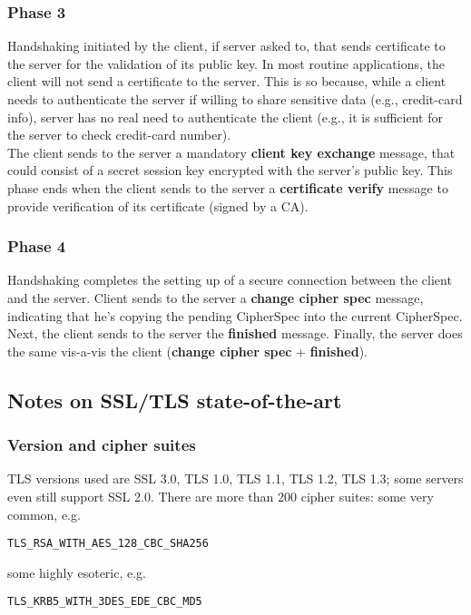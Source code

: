 \documentclass[a4paper, 10pt, titlepage]{article}
\begin{document}
\subsubsection{Phase 3}
Handshaking initiated by the client, if server asked to, that sends certificate to the server for the validation of its public key. In most routine applications, the client will not send a certificate to the server. This is so because, while a client needs to authenticate the server if willing to share sensitive data (e.g., credit-card info), server has no real need to authenticate the client (e.g., it is sufficient for the server to check credit-card number). \\
The client sends to the server a mandatory \textbf{client key exchange} message, that could consist of a secret session key encrypted with the server’s public key. This phase ends when the client sends to the server a \textbf{certificate verify} message to provide verification of its certificate	 (signed by a CA).
\subsubsection{Phase 4}
Handshaking completes the setting up of a secure connection between the client and the server. Client sends to the server a \textbf{change cipher spec} message, indicating that he's copying the pending CipherSpec into the current CipherSpec. Next, the client sends to the server the \textbf{finished} message. Finally, the server does the same vis-a-vis the client (\textbf{change cipher spec} + \textbf{finished}).

\subsection{Notes on SSL/TLS state-of-the-art}
\subsubsection{Version and cipher suites}
TLS versions used are SSL 3.0, TLS 1.0, TLS 1.1, TLS 1.2, TLS 1.3; some servers even still support SSL 2.0.
There are more than 200 cipher suites: some very common, e.g.
\begin{verbatim}
TLS_RSA_WITH_AES_128_CBC_SHA256
\end{verbatim}
some highly esoteric, e.g.
\begin{verbatim}
TLS_KRB5_WITH_3DES_EDE_CBC_MD5
\end{verbatim}
\end{document}

